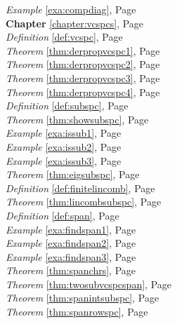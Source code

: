 \begin{multicols}{3}
\begin{center}
      \textit{Example} \ref{exa:compdiag}, Page \pageref{exa:compdiag} \\
      \textbf{Chapter} \ref{chapter:vcspcs}, Page \pageref{chapter:vcspcs} \\
      \textit{Definition} \ref{def:vcspc}, Page \pageref{def:vcspc} \\
      \textit{Theorem} \ref{thm:derpropvcspc1}, Page \pageref{thm:derpropvcspc1} \\
      \textit{Theorem} \ref{thm:derpropvcspc2}, Page \pageref{thm:derpropvcspc2} \\
      \textit{Theorem} \ref{thm:derpropvcspc3}, Page \pageref{thm:derpropvcspc3} \\
      \textit{Theorem} \ref{thm:derpropvcspc4}, Page \pageref{thm:derpropvcspc4} \\
      \textit{Definition} \ref{def:subspc}, Page \pageref{def:subspc} \\
      \textit{Theorem} \ref{thm:showsubspc}, Page \pageref{thm:showsubspc} \\
      \textit{Example} \ref{exa:issub1}, Page \pageref{exa:issub1} \\
      \textit{Example} \ref{exa:issub2}, Page \pageref{exa:issub2} \\
      \textit{Example} \ref{exa:issub3}, Page \pageref{exa:issub3} \\
      \textit{Theorem} \ref{thm:eigsubspc}, Page \pageref{thm:eigsubspc} \\
      \textit{Definition} \ref{def:finitelincomb}, Page \pageref{def:finitelincomb} \\
      \textit{Theorem} \ref{thm:lincombsubspc}, Page \pageref{thm:lincombsubspc} \\
      \textit{Definition} \ref{def:span}, Page \pageref{def:span} \\
      \textit{Example} \ref{exa:findspan1}, Page \pageref{exa:findspan1} \\
      \textit{Example} \ref{exa:findspan2}, Page \pageref{exa:findspan2} \\
      \textit{Example} \ref{exa:findspan3}, Page \pageref{exa:findspan3} \\
      \textit{Theorem} \ref{thm:spanchrs}, Page \pageref{thm:spanchrs} \\
      \textit{Theorem} \ref{thm:twosubvcspcspan}, Page \pageref{thm:twosubvcspcspan} \\
      \textit{Theorem} \ref{thm:spanintsubspc}, Page \pageref{thm:spanintsubspc} \\
      \textit{Theorem} \ref{thm:spanrowspc}, Page \pageref{thm:spanrowspc} \\

\end{center}
\end{multicols}
